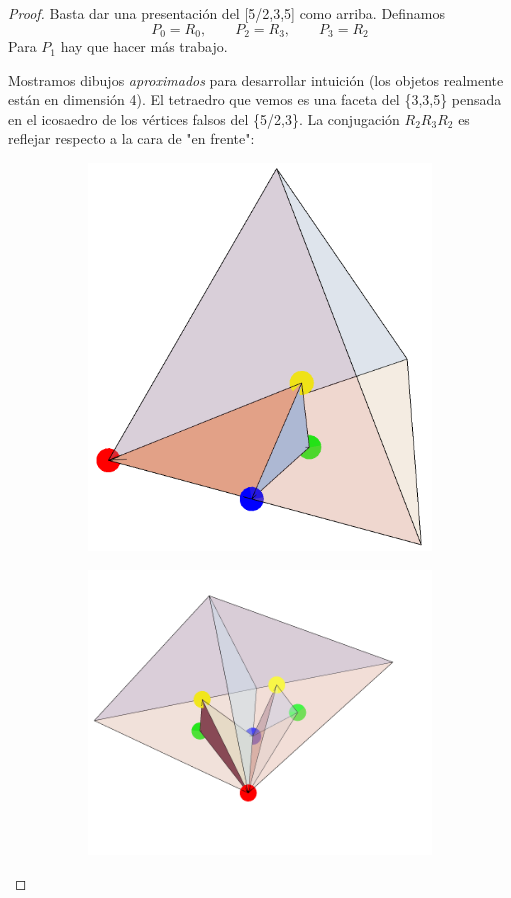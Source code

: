 \documentclass[spanish]{article}
\theoremstyle{definition}
\begin{document}
\begin{proof}
	Basta dar una presentación del [5/2,3,5] como arriba. Definamos 
	\[P_0=R_0,\qquad P_2=R_3,\qquad P_3=R_2\]
	Para $P_1$ hay que hacer más trabajo.
	
	Mostramos dibujos \textit{aproximados} para desarrollar intuición (los objetos realmente están en dimensión 4). El tetraedro que vemos es una faceta del \{3,3,5\} pensada en el icosaedro de los vértices falsos del \{5/2,3\}. La conjugación $R_2R_3R_2$ es reflejar respecto a la cara de "en frente":
	\begin{figure}[H]
		\begin{subfigure}{0.4\linewidth}
			\centering
			\includegraphics[width=0.6\linewidth]{p5}
		\end{subfigure}
		\begin{subfigure}{0.5\linewidth}
			\centering
			\includegraphics[width=0.9\linewidth]{p6}

\end{subfigure}
\end{figure}
\end{proof}
\end{document}
